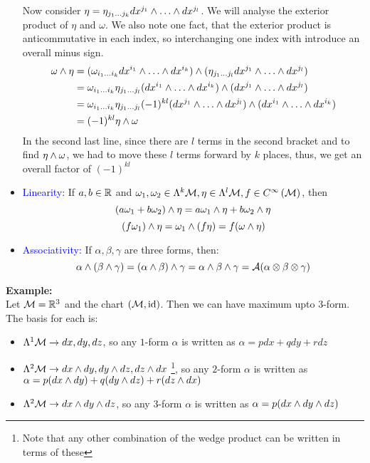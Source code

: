 \begin{itemize}
    Now consider $\eta = \eta_{j_1\ldots j_k}dx^{j_1} \wedge \ldots \wedge dx^{j_l}$. We will analyse the exterior product of $\eta$ and $\omega$. We also note one fact, that the exterior product is anticommutative in each index, so interchanging one index with introduce an overall minus sign. 
    \begin{align*}
        \omega \wedge \eta &= (\omega_{i_1\ldots i_k} dx^{i_1} \wedge \ldots \wedge dx^{i_k})  \wedge (\eta_{j_1\ldots j_l} dx^{j_1} \wedge \ldots \wedge dx^{j_l})\\
        &=\omega_{i_1\ldots i_k}  \eta_{j_1\ldots j_l}(dx^{i_1} \wedge \ldots \wedge dx^{i_k})  \wedge ( dx^{j_1} \wedge \ldots \wedge dx^{j_l}) \\
        &=\omega_{i_1\ldots i_k}  \eta_{j_1\ldots j_l} (-1)^{kl}( dx^{j_1} \wedge \ldots \wedge dx^{j_l}) \wedge  (dx^{i_1} \wedge \ldots \wedge dx^{i_k})\\
        &=(-1)^{kl}\eta \wedge \omega
    \end{align*}
    In the second last line, since there are $l$ terms in the second bracket and to find $\eta \wedge \omega$, we had to move these $l$ terms forward by $k$ places, thus, we get an overall factor of $(-1)^{kl}$
    \item \textcolor{blue}{Linearity}: If $a,b\in \mathbb{R}$ and $\omega_1, \omega_2 \in \Lambda^k\mathcal M, \eta \in \Lambda^l\mathcal M, f\in C^{\infty}\left(\mathcal M\right)$, then
    $$(a\omega_1 + b\omega_2) \wedge \eta = a\omega_1 \wedge \eta+b\omega_2 \wedge \eta$$ 
    $$(f\omega_1) \wedge \eta = \omega_1 \wedge (f\eta)=f(\omega \wedge \eta)$$
    \item \textcolor{blue}{Associativity:} If $\alpha,\beta,\gamma$ are three forms, then:
    $$\alpha \wedge (\beta \wedge \gamma) = (\alpha \wedge \beta) \wedge \gamma= \alpha \wedge \beta \wedge \gamma = \mathcal A(\alpha\otimes\beta\otimes\gamma)$$
\end{itemize}
\textbf{Example:}\\[0.2cm]
Let $\mathcal M = \mathbb{R}^3$ and the chart $(\mathcal M,\mathrm{id})$. Then we can have maximum upto $3$-form. The basis for each is:
\begin{itemize}
    \item $\Lambda^1\mathcal M\rightarrow dx,dy,dz$,  so any $1$-form $\alpha $ is written as $\alpha = pdx+qdy+rdz$
    \item  $\Lambda^2\mathcal M\rightarrow dx \wedge dy,dy \wedge dz,dz \wedge dx$ \footnote{Note that any other combination of the wedge product can be written in terms of these}, so any $2$-form $\alpha $ is written as $\alpha = p( dx \wedge dy)+q(dy \wedge dz)+r(dz \wedge dx)$
    \item $\Lambda^2\mathcal M\rightarrow dx \wedge dy \wedge dz$, so any $3$-form $\alpha $ is written as $\alpha =p (dx \wedge dy \wedge dz)$
\end{itemize}
